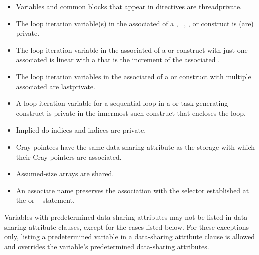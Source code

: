 \begin{fortranspecific}
\begin{itemize}
\item Variables and common blocks that appear in  directives
      are threadprivate.
\item The loop iteration variable(s) in the associated  of a
      , ~, , or  
      construct is (are) private.
\item The loop iteration variable in the associated  of a
       or   construct with just one associated 
       is linear with a  that is the 
      increment of the associated .
\item The loop iteration variables in the associated  of a
       or  construct with multiple associated 
       are lastprivate.
\item A loop iteration variable for a sequential loop in a  
      or task generating construct is private in the innermost such construct 
      that encloses the loop.
\item Implied-do indices and  indices are private.
\item Cray pointees have the same data-sharing attribute as the storage 
      with which their Cray pointers are associated.
\item Assumed-size arrays are shared.
\item An associate name preserves the association with the selector established 
      at the  or ~ statement.
\end{itemize}
\end{fortranspecific}

Variables with predetermined data-sharing attributes may not be listed in 
data-sharing attribute clauses, except for the cases listed below. For these 
exceptions only, listing a predetermined variable in a data-sharing attribute 
clause is allowed and overrides the variable's predetermined data-sharing attributes.

